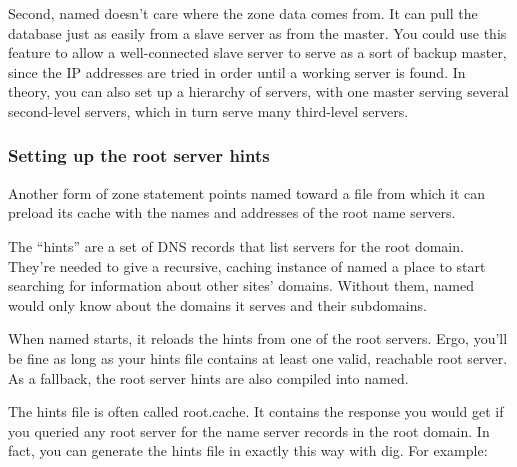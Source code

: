 Second, {named} doesn't care where the zone data comes from. It can pull
the database just as easily from a slave server as from the master. You
could use this feature to allow a well-connected slave server to serve
as a sort of backup master, since the IP addresses are tried in order
until a working server is found. In theory, you can also set up a
hierarchy of servers, with one master serving several second-level
servers, which in turn serve many third-level servers.

\subsubsection[Setting up the root server
hints]{\texorpdfstring{\protect\hypertarget{part0024_split_044.htmlux5cux23_idTextAnchor916}{}{}Setting
up the root server hints}{Setting up the root server hints}}

\protect\hypertarget{part0024_split_044.htmlux5cux23_idIndexMarker2190}{}{}\protect\hypertarget{part0024_split_044.htmlux5cux23_idIndexMarker2191}{}{}\protect\hypertarget{part0024_split_044.htmlux5cux23_idIndexMarker2192}{}{}\protect\hypertarget{part0024_split_044.htmlux5cux23_idIndexMarker2193}{}{}Another
form of {zone} statement points {named} toward a file from which it can
preload its cache with the names and addresses of the root name servers.


The ``hints'' are a set of DNS records that list servers for the root
domain. They're needed to give a recursive, caching instance of {named}
a place to start searching for information about other sites' domains.
Without them, {named} would only know about the domains it serves and
their subdomains.

When {named} starts, it reloads the hints from one of the root servers.
Ergo, you'll be fine as long as your hints file contains at least one
valid, reachable root server. As a fallback, the root server hints are
also compiled into {named}.

The hints file is often called
\protect\hypertarget{part0024_split_044.htmlux5cux23_idIndexMarker2194}{}{}\protect\hypertarget{part0024_split_044.htmlux5cux23_idIndexMarker2195}{}{}{root.cache}.
It contains the response you would get if you queried any root server
for the name server records in the root domain. In fact, you can
generate the hints file in exactly this way with {dig}. For example:


